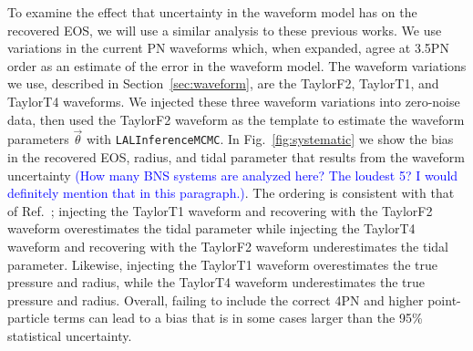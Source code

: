 \documentclass[twocolumn,prd,amssymb,aps,nofootinbib,showpacs,epsf]{revtex4}
\newcommand\les[2]{\textcolor{blue}{{#1}\sout{#2}}}
\begin{document}
To examine the effect that uncertainty in the waveform model has on the recovered EOS, we will use a similar analysis to these previous works. We use variations in the current PN waveforms which, when expanded, agree at 3.5PN order as an estimate of the error in the waveform model. The waveform variations we use, described in Section~\ref{sec:waveform}, are the TaylorF2, TaylorT1, and TaylorT4 waveforms. We injected these three waveform variations into zero-noise data, then used the TaylorF2 waveform as the template to estimate the waveform parameters $\vec\theta$ with \texttt{LALInferenceMCMC}. In Fig.~\ref{fig:systematic} we show the bias in the recovered EOS, radius, and tidal parameter that results from the waveform uncertainty \les{(How many BNS systems are analyzed here? The loudest 5?  I would definitely mention that in this paragraph.)}{}. The ordering is consistent with that of Ref.~\cite{WadeCreightonOchsner2014}; injecting the TaylorT1 waveform and recovering with the TaylorF2 waveform overestimates the tidal parameter while injecting the TaylorT4 waveform and recovering with the TaylorF2 waveform underestimates the tidal parameter. Likewise, injecting the TaylorT1 waveform overestimates the true pressure and radius, while the TaylorT4 waveform underestimates the true pressure and radius. Overall, failing to include the correct 4PN and higher point-particle terms can lead to a bias that is in some cases larger than the 95\% statistical uncertainty.
\end{document}
